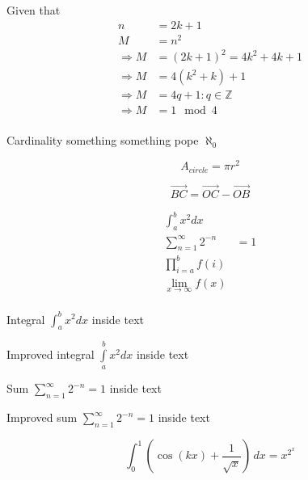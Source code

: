 \documentclass{article}
\begin{document}
Given that
\begin{align*}
    n &= 2k + 1\\
    M &= n^{2}\\
    \Rightarrow M &= (2k + 1)^{2} = 4k^{2} + 4k + 1\\
    \Rightarrow M &= 4(k^{2} + k) + 1\\
    \Rightarrow M &= 4q + 1 : q \in \mathbb{Z}\\
    \Rightarrow M &= 1 \mod 4\\
\end{align*}

Cardinality something something pope $\aleph_0$

\begin{equation*}
    A_{circle} = \pi{}r^{2}
\end{equation*}

\begin{equation*}
    \vec{BC} = \vec{OC} - \vec{OB}
\end{equation*}

\begin{align*}
    \int_{a}^{b} x^2 dx\\
    \sum_{n=1}^{\infty} 2^{-n} &= 1\\
    \prod_{i=a}^{b} f(i)\\
    \lim_{x\to\infty} f(x)\\
\end{align*}

Integral $\int_{a}^{b} x^2 dx$ inside text

Improved integral $\int\limits_{a}^{b} x^2 dx$ inside text

Sum $\sum_{n=1}^{\infty} 2^{-n} = 1$ inside text

Improved sum $\sum\limits_{n=1}^{\infty} 2^{-n} = 1$ inside text 

\begin{equation}
\int_{0}^{1} \left(\cos{\left (k x \right )} + \frac{1}{\sqrt{x}}\right)\, dx = x^{2^{x}}
\end{equation}
\end{document}
